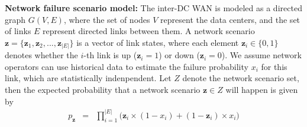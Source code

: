 \documentclass[sigconf]{acmart}
\begin{document}
\textbf{Network failure scenario model:} 
The inter-DC WAN is modeled as a directed graph $G(V,E)$, where the set of nodes $V$ represent the data centers, 
and the set of links $E$ represent directed links between them. 
A network scenario $\mathbf{z}=\{\mathbf{z}_1,\mathbf{z}_2,...,\mathbf{z}_{|E|}\}$ is a vector of link states, 
where each element $\mathbf{z}_i \in \{0,1\}$ denotes whether the $i$-th link is up ($\mathbf{z}_i=1$) or down ($\mathbf{z}_i=0$). 
We assume network operators can use historical data to estimate the failure probability $x_i$ for this link, which are statistically indenpendent. 
Let $Z$ denote the network scenario set, %
then the expected probability that a network scenario  $\mathbf{z} \in Z$ will happen is given by \cite{Teavar} 
\begin{eqnarray} \label{state}
p_{\mathbf{z}}&=&\prod_{i=1}^{|E|}\big(\mathbf{z}_i \times (1-x_i)+ (1-\mathbf{z}_i) \times x_i\big)
\end{eqnarray}
\end{document}
